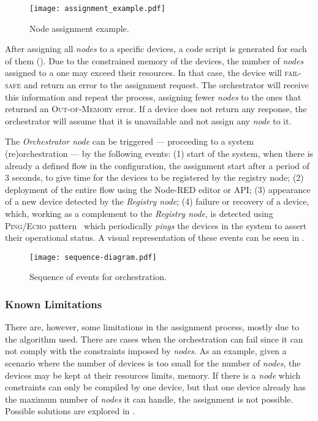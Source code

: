 \begin{figure}[h]
\centering
\texttt{[image: assignment\_example.pdf]}
\caption[Node assignment example.]{Node assignment example.}\label{fig:assigment_example}
\end{figure}

After assigning all \textit{nodes} to a specific devices, a code script is generated for each of them (\cf {}). Due to the constrained memory of the devices, the number of \textit{nodes} assigned to a one may exceed their resources. In that case, the device will \textsc{fail-safe} and return an error to the assignment request. The orchestrator will receive this information and repeat the process, assigning fewer \textit{nodes} to the ones that returned an \textsc{Out-of-Memory} error. If a device does not return any response, the orchestrator will assume that it is unavailable and not assign any \textit{node} to it.

The \textit{Orchestrator node} can be triggered --- proceeding to a system (re)orchestration --- by the following events: (1) start of the system, when there is already a defined flow in the configuration, the assignment start after a period of 3 seconds, to give time for the devices to be registered by the registry node; (2) deployment of the entire flow using the Node-RED editor or API; (3) appearance of a new device detected by the \textit{Registry node}; (4) failure or recovery of a device, which, working as a complement to the \textit{Registry node}, is detected using \textsc{Ping/Echo} pattern~\cite{Scott2009} which periodically \textit{pings} the devices in the system to assert their operational status. A visual representation of these events can be seen in . 

\begin{figure}[h]
\centering
\texttt{[image: sequence-diagram.pdf]}
\caption[Sequence of events for orchestration.]{Sequence of events for orchestration.}\label{fig:sequence_diagram}
\end{figure}

\subsubsection{Known Limitations}\label{sec:solution_known_limitations}

There are, however, some limitations in the assignment process, mostly due to the algorithm used. There are cases when the orchestration can fail since it can not comply with the constraints imposed by \textit{nodes}. As an example, given a scenario where the number of devices is too small for the number of \textit{nodes}, the devices may be kept at their resources limits, \ie memory. If there is a \textit{node} which constraints can only be compiled by one device, but that one device already has the maximum number of \textit{nodes} it can handle, the assignment is not possible. Possible solutions are explored in .

